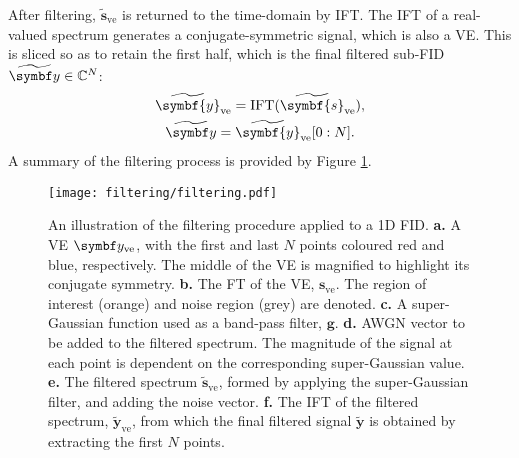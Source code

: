 After filtering, $\widetilde{\symbf{s}}_{\text{ve}}$ is returned to the
time-domain by \ac{IFT}. The \ac{IFT} of a real-valued spectrum generates a
conjugate-symmetric signal, which is also a \ac{VE}. This is sliced so as to
retain the first half, which is the final filtered sub-FID $\widetilde{\by} \in
\mathbb{C}^{N}$:
\begin{subequations}
    \begin{gather}
        \widetilde{\symbf{y}}_{\text{ve}} = \IFT(\widetilde{\symbf{s}}_{\text{ve}}),\\
        \widetilde{\by} = \widetilde{\symbf{y}}_{\text{ve}}[0 : N].
    \end{gather}
    \label{eq:yve-tilde}
\end{subequations}
A summary of the filtering process is provided by Figure \ref{fig:filtering}.
\begin{figure}
     \centering
     \texttt{[image: filtering/filtering.pdf]}
     \caption[
         An illustration of the filtering procedure applied to a \acs{1D}
         \acs{FID}.
     ]{
         An illustration of the filtering procedure applied to a \ac{1D}
         \ac{FID}.
         \textbf{a.} A \ac{VE} $\by_{\text{ve}}$, with the first and last
         $N$ points coloured red and blue, respectively. The middle of the
         \ac{VE} is magnified to highlight its conjugate symmetry.
         \textbf{b.} The \ac{FT} of the \ac{VE}, $\symbf{s}_{\text{ve}}$.
         The region of interest (orange) and noise region (grey) are denoted.
         \textbf{c.} A super-Gaussian function used as a band-pass filter,
         $\symbf{g}$.
         \textbf{d.} \acs{AWGN} vector to be added to the filtered spectrum.
         The magnitude of the signal at each point is dependent on the
         corresponding super-Gaussian value.
         \textbf{e.} The filtered spectrum $\widetilde{\symbf{s}}_{\text{ve}}$,
         formed by applying the super-Gaussian filter, and adding the noise
         vector.
         \textbf{f.} The \ac{IFT} of the filtered spectrum,
         $\widetilde{\symbf{y}}_{\text{ve}}$, from which the final filtered
         signal $\widetilde{\symbf{y}}$ is obtained by extracting
         the first $N$ points.
     }
     \label{fig:filtering}
\end{figure}

